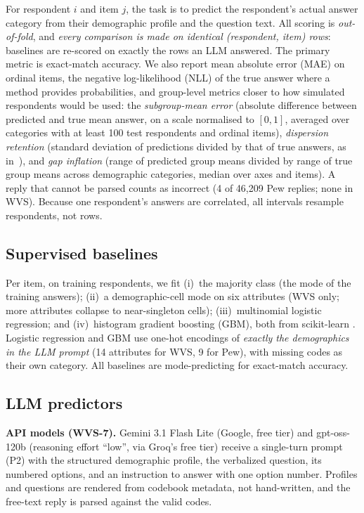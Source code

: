 \documentclass[conference]{IEEEtran}
\begin{document}
For respondent $i$ and item $j$, the task is to predict the respondent's actual answer category from their demographic profile and the question text. All scoring is \emph{out-of-fold}, and \emph{every comparison is made on identical (respondent, item) rows}: baselines are re-scored on exactly the rows an LLM answered. The primary metric is exact-match accuracy. We also report mean absolute error (MAE) on ordinal items, the negative log-likelihood (NLL) of the true answer where a method provides probabilities, and group-level metrics closer to how simulated respondents would be used: the \emph{subgroup-mean error} (absolute difference between predicted and true mean answer, on a scale normalised to $[0,1]$, averaged over categories with at least 100 test respondents and ordinal items), \emph{dispersion retention} (standard deviation of predictions divided by that of true answers, as in~\cite{ziaei2026}), and \emph{gap inflation} (range of predicted group means divided by range of true group means across demographic categories, median over axes and items). A reply that cannot be parsed counts as incorrect (4 of 46{,}209 Pew replies; none in WVS). Because one respondent's answers are correlated, all intervals resample respondents, not rows.

\subsection{Supervised baselines}

Per item, on training respondents, we fit (i)~the majority class (the mode of the training answers); (ii)~a demographic-cell mode on six attributes (WVS only; more attributes collapse to near-singleton cells); (iii)~multinomial logistic regression; and (iv)~histogram gradient boosting (GBM), both from scikit-learn \cite{pedregosa2011}. Logistic regression and GBM use one-hot encodings of \emph{exactly the demographics in the LLM prompt} (14 attributes for WVS, 9 for Pew), with missing codes as their own category. All baselines are mode-predicting for exact-match accuracy.

\subsection{LLM predictors}

\textbf{API models (WVS-7).} Gemini 3.1 Flash Lite (Google, free tier) and gpt-oss-120b \cite{gptoss2025} (reasoning effort ``low'', via Groq's free tier) receive a single-turn prompt (P2) with the structured demographic profile, the verbalized question, its numbered options, and an instruction to answer with one option number. Profiles and questions are rendered from codebook metadata, not hand-written, and the free-text reply is parsed against the valid codes.
\end{document}
